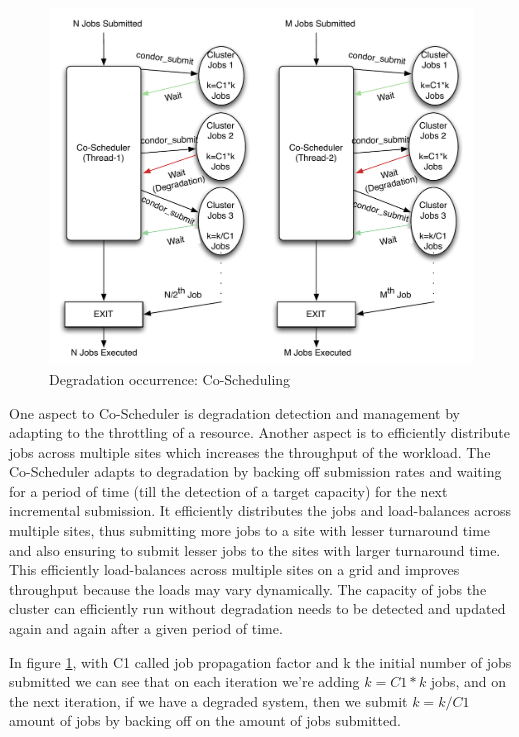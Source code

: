 \documentclass[ms,electronic,double]{nuthesis}
\begin{document}
\begin{figure}[htbp!]
\begin{center}
\includegraphics[scale=0.75]{images/degradation_detection}
\caption{Degradation occurrence: Co-Scheduling}
\label{fig:degradationdetect-intro}
\end{center}
\end{figure}

One aspect to Co-Scheduler is degradation detection and management by adapting 
to the throttling of a resource. Another aspect is to efficiently distribute jobs 
across multiple sites which increases the throughput of the workload. The Co-Scheduler adapts to degradation by backing off submission rates and waiting for a 
period of time (till the detection of a target capacity) for the next incremental submission. It efficiently 
distributes the jobs and load-balances across multiple sites, thus submitting more 
jobs to a site with lesser turnaround time and also ensuring to submit lesser 
jobs to the sites with larger turnaround time. This efficiently load-balances 
across multiple sites on a grid and improves throughput because the loads may vary dynamically. 
The capacity of jobs the cluster can efficiently run without degradation needs to be detected and updated again and 
again after a given period of time.

In figure \ref{fig:degradationdetect-intro}, with C1 called job propagation factor and k the initial number of 
jobs submitted we can see that on each iteration we're adding $k = C1 * k$ jobs, and on the
next iteration, if we have a degraded system, then we submit $k=k/C1$ amount of 
jobs by backing off on the amount of jobs submitted.
\end{document}
